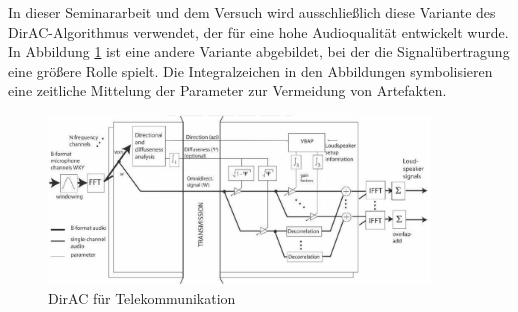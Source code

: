 
In dieser Seminararbeit und dem Versuch wird ausschließlich diese Variante des DirAC-Algorithmus verwendet, der für eine hohe Audioqualität entwickelt wurde. In Abbildung \ref{fig:dirac_flow_low} ist eine andere Variante abgebildet, bei der die Signalübertragung eine größere Rolle spielt. Die Integralzeichen in den Abbildungen symbolisieren eine zeitliche Mittelung der Parameter zur Vermeidung von Artefakten.

\begin{figure}[!ht]
  \centering
  \includegraphics[width=0.9\textwidth]{funktionsweise/pic/pulkki_dirac_flow_3.png}
  \caption{DirAC für Telekommunikation\protect\footnotemark}
  \label{fig:dirac_flow_low}
\end{figure}

